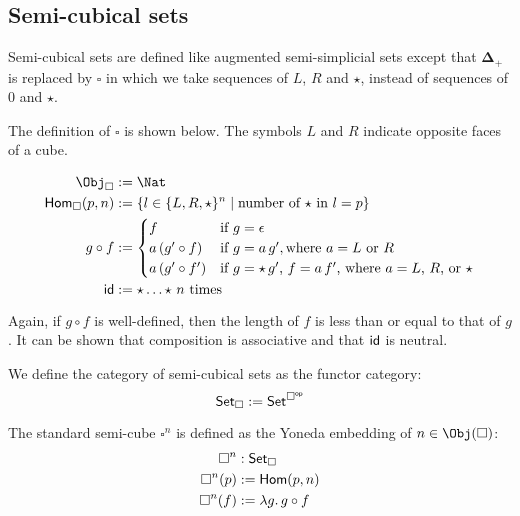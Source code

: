 \documentclass{msc}
\newcommand{\DeltaPlus}{\ensuremath{\boldsymbol{\Delta}_+}}
\newcommand{\Cube}{\ensuremath{\boldsymbol{{\square}}}}
\newcommand{\CSet}{\ensuremath{\mathsf{Set}_{\boldsymbol{\square}}}}
\newcommand{\kstar}{{\star}}
\begin{document}
\subsection*{Semi-cubical sets}
Semi-cubical sets are defined like augmented semi-simplicial sets except that $\DeltaPlus$ is replaced by $\Cube$ in which we take sequences of $L$, $R$ and $\kstar$, instead of sequences of $0$ and $\kstar$.

\begin{definition}[\Cube]
  The definition of $\Cube$ is shown below. The symbols $L$ and $R$ indicate opposite faces of a cube.

  \begin{align*}
    \Obj_{\Cube}       & := \Nat                                                                   \\
    \Hom_{\Cube}(p, n) & := \{l \in \{L, R, \kstar\}^n \mid \text{number of $\kstar$ in $l = p$}\} \\
    g \circ f          & :=
    \begin{cases}
      f                & \text{if $g = \epsilon$}                                                 \\
      a\,(g' \circ f)  & \text{if $g = a\,g'$}, \text{where $a = L$ or $R$}                       \\
      a\,(g' \circ f') & \text{if $g = \kstar\,g'$, $f = a\,f'$, where $a = L$, $R$, or $\kstar$} \\
    \end{cases}    \\
    \id                & := \kstar \ldots \kstar \text{ $n$ times}
  \end{align*}

  Again, if $g \circ f$ is well-defined, then the length of $f$ is less than or equal to that of $g$. It can be shown that composition is associative and that $\mathsf{id}$ is neutral.
\end{definition}

\begin{definition}[\CSet]
  We define the category of semi-cubical sets as the functor category:
  \begin{equation*}
    \CSet := \Set^{\op{\Cube}}
  \end{equation*}
\end{definition}

\begin{definition}[$\Cube^n$]
  The standard semi-cube $\Cube^n$ is defined as the Yoneda embedding of $n \in \Obj(\Cube)$:
  \begin{align*}
    \Cube^n    & : \CSet                    \\
    \Cube^n(p) & := \Hom(p, n)              \\
    \Cube^n(f) & := \lambda g .\, g \circ f
  \end{align*}
\end{definition}
\end{document}
